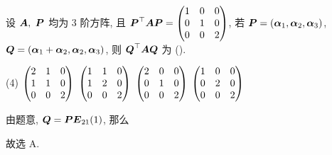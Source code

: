 \begin{example}[2009 数二]
    设 $\vb*{A},~\vb*{P}$ 均为 3 阶方阵, 且 $\vb*{P}^\top\vb*{AP}=\mqty(1&0&0\\0&1&0\\0&0&2)$, 若 $\vb*{P}=(\vb*{\alpha}_1,\vb*{\alpha}_2,\vb*{\alpha}_3)$, $\vb*{Q}=(\vb*{\alpha}_1+\vb*{\alpha}_2,\vb*{\alpha}_2,\vb*{\alpha}_3)$, 
    则 $\vb*{Q}^\top\vb*{AQ}$ 为 (\quad).
    \begin{tasks}(4)
        \task $\mqty(2&1&0\\1&1&0\\0&0&2)$
        \task $\mqty(1&1&0\\1&2&0\\0&0&2)$
        \task $\mqty(2&0&0\\0&1&0\\0&0&2)$
        \task $\mqty(1&0&0\\0&2&0\\0&0&2)$
    \end{tasks}
\end{example}
\begin{solution}
    由题意, $\vb*{Q}=\vb*{PE}_{21}(1)$, 那么
    故选 A.
\end{solution}

